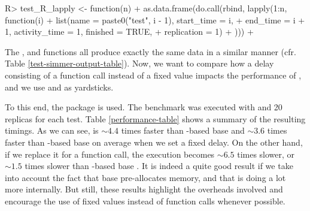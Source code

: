 \documentclass[
  nojss]{jss}
\begin{document}
\begin{CodeChunk}
\begin{CodeInput}
R> test_R_lapply <- function(n) {
+   as.data.frame(do.call(rbind, lapply(1:n, function(i) {
+     list(name = paste0("test", i - 1), start_time = i,
+       end_time = i + 1, activity_time = 1, finished = TRUE,
+       replication = 1)
+   })))
+ }
\end{CodeInput}
\end{CodeChunk}

The ,  and 
functions all produce exactly the same data in a similar manner (cfr.
Table \ref{test-simmer-output-table}). Now, we want to compare how a
delay consisting of a function call instead of a fixed value impacts the
performance of , and we use  and
 as yardsticks.

To this end, the  package
\citep{CRAN:microbenchmark} is used. The benchmark was executed with
 and 20 replicas for each test. Table
\ref{performance-table} shows a summary of the resulting timings. As we
can see,  is \(\sim4.4\) times faster than -based
base  and \(\sim3.6\) times faster than -based
base  on average when we set a fixed delay. On the other
hand, if we replace it for a function call, the execution becomes
\(\sim6.5\) times slower, or \(\sim1.5\) times slower than
-based base . It is indeed a quite good result if
we take into account the fact that base  pre-allocates
memory, and that  is doing a lot more internally. But still,
these results highlight the overheads involved and encourage the use of
fixed values instead of function calls whenever possible.
\end{document}

